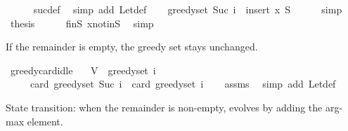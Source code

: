 \begin{isabellebody}
\ \ \ \ \isamarkupfalse%
\ suc{\isacharunderscore}{\kern0pt}def\ \isamarkupfalse%
\ {\isacharparenleft}{\kern0pt}simp\ add{\isacharcolon}{\kern0pt}\ Let{\isacharunderscore}{\kern0pt}def{\isacharparenright}{\kern0pt}\isanewline
\ \ \isamarkupfalse%
\ {\isachardoublequoteopen}greedy{\isacharunderscore}{\kern0pt}set\ {\isacharparenleft}{\kern0pt}Suc\ i{\isacharparenright}{\kern0pt}\ {\isacharequal}{\kern0pt}\ insert\ {\isacharquery}{\kern0pt}x\ {\isacharquery}{\kern0pt}S{\isachardoublequoteclose}\isanewline
\ \ \ \ \isamarkupfalse%
\ simp\isanewline
\isanewline
\ \ \isamarkupfalse%
\ {\isacharquery}{\kern0pt}thesis\isanewline
\ \ \ \ \isamarkupfalse%
\ finS\ x{\isacharunderscore}{\kern0pt}notin{\isacharunderscore}{\kern0pt}S\ \isamarkupfalse%
\ simp\isanewline
{}\isamarkupfalse%
%
\endisatagproof
{\isafoldproof}%
%
\isadelimproof
%
\endisadelimproof
%
\begin{isamarkuptext}%
If the remainder is empty, the greedy set stays unchanged.%
\end{isamarkuptext}\isamarkuptrue%
\isamarkupfalse%
\ greedy{\isacharunderscore}{\kern0pt}card{\isacharunderscore}{\kern0pt}idle{\isacharcolon}{\kern0pt}\isanewline
\ \ \ {\isachardoublequoteopen}V\ {\isacharminus}{\kern0pt}\ greedy{\isacharunderscore}{\kern0pt}set\ i\ {\isacharequal}{\kern0pt}\ {\isacharbraceleft}{\kern0pt}{\isacharbraceright}{\kern0pt}{\isachardoublequoteclose}\isanewline
\ \ \ \ \ {\isachardoublequoteopen}card\ {\isacharparenleft}{\kern0pt}greedy{\isacharunderscore}{\kern0pt}set\ {\isacharparenleft}{\kern0pt}Suc\ i{\isacharparenright}{\kern0pt}{\isacharparenright}{\kern0pt}\ {\isacharequal}{\kern0pt}\ card\ {\isacharparenleft}{\kern0pt}greedy{\isacharunderscore}{\kern0pt}set\ i{\isacharparenright}{\kern0pt}{\isachardoublequoteclose}\isanewline
%
\isadelimproof
\ \ %
\endisadelimproof
%
\isatagproof
{}\isamarkupfalse%
\ assms\ \isamarkupfalse%
\ {\isacharparenleft}{\kern0pt}simp\ add{\isacharcolon}{\kern0pt}\ Let{\isacharunderscore}{\kern0pt}def{\isacharparenright}{\kern0pt}%
\endisatagproof
{\isafoldproof}%
%
\isadelimproof
%
\endisadelimproof
%
\begin{isamarkuptext}%
State transition: when the remainder is non-empty,  evolves by adding
  the arg-max element.%
\end{isamarkuptext}\isamarkuptrue%

\end{isabellebody}
